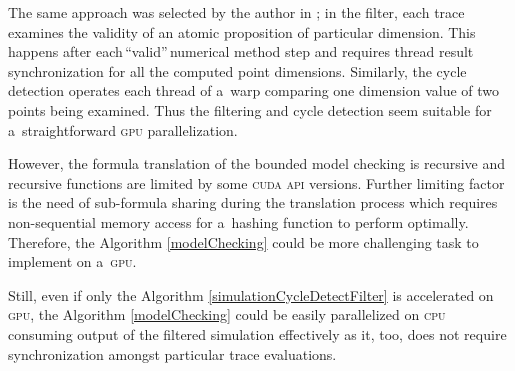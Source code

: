 \documentclass[12pt,twoside,draft]{fithesis}
\begin{document}
The same approach was selected by the author in \cite{me:cuda}; in the
filter, each trace examines the validity of an atomic proposition of
particular dimension. This happens after each\,``valid''\,numerical
method step and requires thread result synchronization for all the
computed point dimensions. Similarly, the cycle detection operates each
thread of a~warp comparing one dimension value of two points being
examined. Thus the filtering and cycle detection seem suitable for
a~straightforward \textsc{gpu} parallelization.

However, the formula translation of the bounded model checking is
recursive and recursive functions are limited by some \textsc{cuda}
\textsc{api} versions\cite{cuda:relnotes}. Further limiting factor is
the need of sub-formula sharing during the translation process which
requires non-sequential memory access for a~hashing function to perform
optimally. Therefore, the Algorithm \ref{modelChecking} could be more
challenging task to implement on a~\textsc{gpu}.

Still, even if only the Algorithm \ref{simulationCycleDetectFilter}
is accelerated on \textsc{gpu}, the Algorithm \ref{modelChecking}
could be easily parallelized on \textsc{cpu} consuming output of the
filtered simulation effectively as it, too, does not require
synchronization amongst particular trace evaluations.



\end{document}
